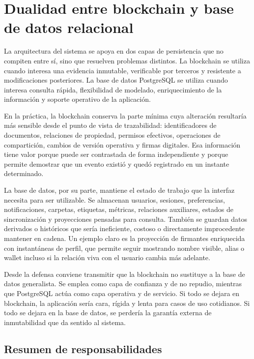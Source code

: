 \documentclass[11pt, a4paper]{article}
\begin{document}
\section{Dualidad entre blockchain y base de datos relacional}

La arquitectura del sistema se apoya en dos capas de persistencia que no compiten entre sí, sino que resuelven problemas distintos. La blockchain se utiliza cuando interesa una evidencia inmutable, verificable por terceros y resistente a modificaciones posteriores. La base de datos PostgreSQL se utiliza cuando interesa consulta rápida, flexibilidad de modelado, enriquecimiento de la información y soporte operativo de la aplicación.

En la práctica, la blockchain conserva la parte mínima cuya alteración resultaría más sensible desde el punto de vista de trazabilidad: identificadores de documentos, relaciones de propiedad, permisos efectivos, operaciones de compartición, cambios de versión operativa y firmas digitales. Esa información tiene valor porque puede ser contrastada de forma independiente y porque permite demostrar que un evento existió y quedó registrado en un instante determinado.

La base de datos, por su parte, mantiene el estado de trabajo que la interfaz necesita para ser utilizable. Se almacenan usuarios, sesiones, preferencias, notificaciones, carpetas, etiquetas, métricas, relaciones auxiliares, estados de sincronización y proyecciones pensadas para consulta. También se guardan datos derivados o históricos que sería ineficiente, costoso o directamente improcedente mantener en cadena. Un ejemplo claro es la proyección de firmantes enriquecida con instantáneas de perfil, que permite seguir mostrando nombre visible, alias o wallet incluso si la relación viva con el usuario cambia más adelante.

Desde la defensa conviene transmitir que la blockchain no sustituye a la base de datos generalista. Se emplea como capa de confianza y de no repudio, mientras que PostgreSQL actúa como capa operativa y de servicio. Si todo se dejara en blockchain, la aplicación sería cara, rígida y lenta para casos de uso cotidianos. Si todo se dejara en la base de datos, se perdería la garantía externa de inmutabilidad que da sentido al sistema.

\subsection{Resumen de responsabilidades}
\end{document}
